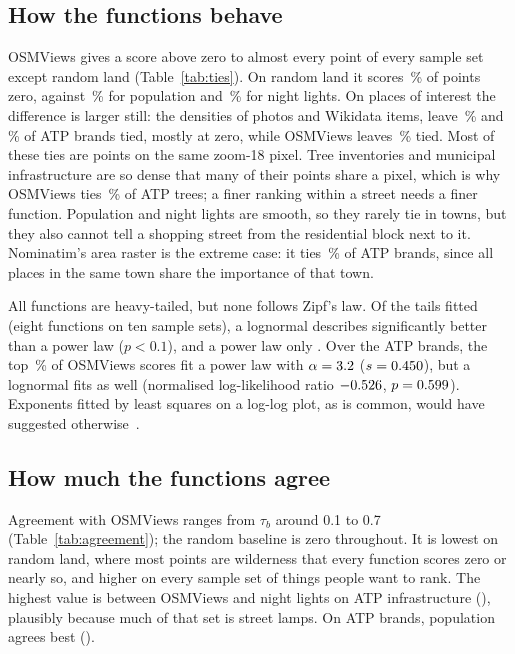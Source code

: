 \documentclass[10pt,twocolumn]{article}
\begin{document}
\subsection{How the functions behave}
OSMViews gives a score above zero to almost every point of every sample
set except random land (Table~\ref{tab:ties}). On random land it scores
\resRankingLandOsmviewsZeroPct\,\% of points zero, against
\resRankingLandPopulationZeroPct\,\% for population and
\resRankingLandLightsZeroPct\,\% for night lights. On places of interest the
difference is larger still: the densities of photos and Wikidata items,
leave \resRankingBrandsPhotosTiedPct\,\% and
\resRankingBrandsItemsTiedPct\,\% of ATP brands tied, mostly at zero,
while OSMViews leaves \resRankingBrandsOsmviewsTiedPct\,\% tied. Most of these ties are points on the same zoom-18 pixel. Tree
inventories and municipal infrastructure are so dense that many of their
points share a pixel, which is why OSMViews ties
\resRankingTreesOsmviewsTiedPct\,\% of ATP trees; a finer ranking within
a street needs a finer function. Population and night lights are smooth,
so they rarely tie in towns, but they also cannot tell a shopping street
from the residential block next to it. Nominatim's area raster is the
extreme case: it ties \resRankingBrandsNominatimTiedPct\,\% of ATP brands,
since all places in the same town share the importance of that town.

All functions are heavy-tailed, but none follows Zipf's law. Of the
\resRankingTailsFits{} tails fitted (eight functions on ten sample sets), a
lognormal describes \resRankingTailsLognormal{} significantly better than
a power law ($p < 0.1$), and a power law only \resRankingTailsPowerLaw.
Over the ATP brands, the top \resRankingBrandsOsmviewsPowerLawTailPct\,\%
of OSMViews scores fit a power law with $\alpha =
3.2$ ($s = 0.450$),
but a lognormal fits as well (normalised log-likelihood ratio
$-0.526$, $p =
0.599$). Exponents fitted by
least squares on a log-log plot, as is common, would have suggested
otherwise~\cite{clauset}.

\subsection{How much the functions agree}
Agreement with OSMViews ranges from $\tau_b$ around 0.1 to 0.7
(Table~\ref{tab:agreement}); the random baseline is zero throughout. It is
lowest on random land, where most points are wilderness that every
function scores zero or nearly so, and higher on every sample set of
things people want to rank. The highest value is between OSMViews and
night lights on ATP infrastructure
(\resRankingInfrastructureLightsKendallOsmviews), plausibly because much of
that set is street lamps. On ATP brands, population agrees best
(\resRankingBrandsPopulationKendallOsmviews).
\end{document}
